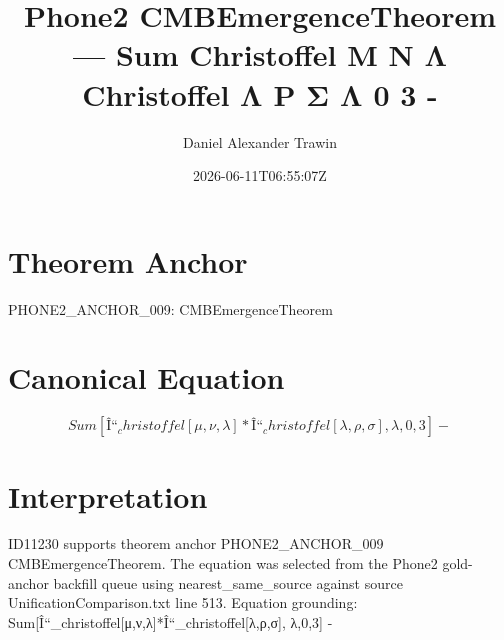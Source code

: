 \documentclass[11pt]{article}
\title{Phone2 CMBEmergenceTheorem — Sum Christoffel Μ Ν Λ Christoffel Λ Ρ Σ Λ 0 3 -}
\author{Daniel Alexander Trawin}
\date{2026-06-11T06:55:07Z}
\begin{document}
\maketitle
\section*{Theorem Anchor}
PHONE2_ANCHOR_009: CMBEmergenceTheorem
\section*{Canonical Equation}
\[
Sum[Î“_christoffel[μ,ν,λ]*Î“_christoffel[λ,ρ,σ], {λ,0,3}] -
\]
\section*{Interpretation}
ID11230 supports theorem anchor PHONE2_ANCHOR_009 CMBEmergenceTheorem. The equation was selected from the Phone2 gold-anchor backfill queue using nearest_same_source against source UnificationComparison.txt line 513. Equation grounding: Sum[Î“_christoffel[μ,ν,λ]*Î“_christoffel[λ,ρ,σ], {λ,0,3}] -
\end{document}
